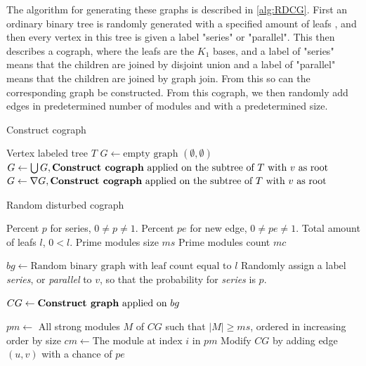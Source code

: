 \documentclass[a4paper]{article}
\begin{document}
The algorithm for generating these graphs is described in \autoref{alg:RDCG}.
First an ordinary binary tree is randomly generated with a specified amount of
leafs , and then every vertex in this tree is given a label "series" or
"parallel".  This then describes a cograph, where the leafs are the $K_1$ bases,
and a label of "series" means that the children are joined by disjoint union and
a label of "parallel" means that the children are joined by graph join.  From
this so can the corresponding graph be constructed. From this cograph, we then
randomly add edges in predetermined number of modules and with a predetermined
size. 

\begin{algorithm}[H]
    \caption{Construct cograph}
    \label{alg:constructcograph}
   \begin{algorithmic}[1]
        \REQUIRE Vertex labeled tree $T$
        \ENDIF
        \STATE $G \leftarrow \text{empty graph $(\emptyset,\emptyset)$}$
                \STATE $G \leftarrow \bigcup G, \text{\textbf{Construct cograph} applied
                on the subtree of $T$ with $v$ as root} $
                \STATE $G \leftarrow \nabla G, \text{\textbf{Construct cograph} applied
                on the subtree of $T$ with $v$ as root}$
            \ENDIF
        \ENDFOR
    \end{algorithmic}
\end{algorithm}

\begin{algorithm}[H]
    \caption{Random disturbed cograph}
  \label{alg:RDCG}
  \begin{algorithmic}[1]
      \REQUIRE Percent $p$ for series, $0 \neq p \neq 1$.
      \REQUIRE Percent $pe$ for new  edge, $0 \neq pe \neq 1$.
      \REQUIRE Total amount of leafs $l$, $0 < l$.
      \REQUIRE Prime modules size $ms$
      \REQUIRE Prime modules count $mc$

      \STATE $bg \leftarrow \text{Random binary graph with leaf count equal to $l$}$
        \STATE Randomly assign a label  \textit{series}, or \textit{parallel} to $v$, so
        that the probability for \textit{series} is $p$.
      \ENDFOR

      \STATE $CG \leftarrow \text{\textbf{Construct graph} applied on $bg$}$

      \STATE $pm \leftarrow $ All strong modules $M$ of $CG$ such that $|M| \geq ms$, ordered in increasing order by size
        \STATE $cm \leftarrow \text{The module at index $i$ in $pm$}$
            \STATE Modify $CG$ by adding edge $(u,v)$ with a chance of $pe$
        \ENDFOR
      \ENDFOR
  \end{algorithmic}
\end{algorithm}
\end{document}
